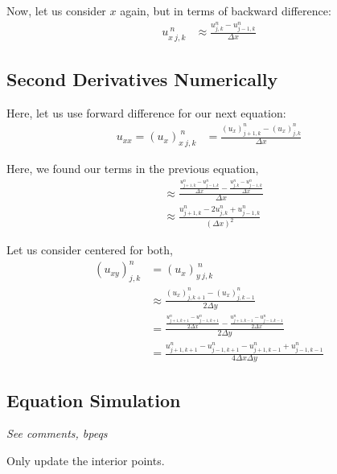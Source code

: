 Now, let us consider $x$ again, but in terms of backward difference:
%
\begin{align}
  u^{\ n}_{x\ j, k} & \approx \frac{u^n_{j, k} - u^n_{j - 1, k}}{\Delta x}
\end{align}

\subsection{Second Derivatives Numerically}

Here, let us use forward difference for our next equation:
%
\begin{align}
  u_{xx} = (u_x)^{\ n}_{x\ j,k}
  & = \frac{(u_x)^n_{j + 1, k} - (u_x)^n_{j, k}}{\Delta x}
\end{align}

Here, we found our terms in the previous equation,
%
\begin{align}
  & \approx
  \frac
  {
  \frac{u^n_{j+1, k} - u^n_{j - 1, k}}{\Delta x} -
  \frac{u^n_{j, k} - u^n_{j - 1, k}}{\Delta x}
  }
  {\Delta x}\\
  & \approx
  \frac
  {
  u^n_{j+1, k} - 2u^n_{j, k} + u^n_{j - 1, k}
  }
  {(\Delta x)^2}
\end{align}

\smallbreak

Let us consider centered for both,
%
\begin{align}
  (u_{xy})^n_{j, k} & = (u_x)^{\ n}_{y\ j, k}\\
  & \approx
  \frac
  {
  (u_x)^n_{j, k+1} - (u_x)^n_{j, k - 1}
  }
  {2 \Delta y}\\
  & =
  \frac
  {
  \frac{u^n_{j + 1, k+1} - u^n_{j-1, k+1}}{2\Delta x}
  -
  \frac{u^n_{j+1, k - 1} - u^n_{j - 1, k - 1}}{2 \Delta x}
  }
  {2\Delta y}\\
  & = \frac
  {
  u^n_{j+1, k+1} -
  u^n_{j-1, k+1} -
  u^n_{j+1, k-1} +
  u^n_{j-1, k-1}
  }
  {4 \Delta x \Delta y}
\end{align}

\subsection{Equation Simulation}

\emph{See comments, bpeqs}

Only update the interior points.



